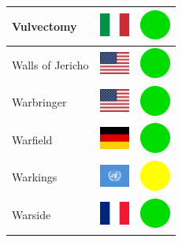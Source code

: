 \documentclass[12pt, a4paper, twoside]{report}
\begin{document}
\begin{center}
\begin{longtable}{|p{5cm}|p{2cm}|p{2cm}|}
 Vulvectomy                                                 & \includegraphics[width=1cm]{4x3/it} &   \includegraphics[width=1cm]{likes/y} \\ \hline
 Walls of Jericho                                           & \includegraphics[width=1cm]{4x3/us} &   \includegraphics[width=1cm]{likes/y} \\ \hline
 Warbringer                                                 & \includegraphics[width=1cm]{4x3/us} &   \includegraphics[width=1cm]{likes/y} \\ \hline
 Warfield                                                   & \includegraphics[width=1cm]{4x3/de} &   \includegraphics[width=1cm]{likes/y} \\ \hline
 Warkings                                                   & \includegraphics[width=1cm]{4x3/un} &   \includegraphics[width=1cm]{likes/m} \\ \hline
 Warside                                                    & \includegraphics[width=1cm]{4x3/fr} &   \includegraphics[width=1cm]{likes/y} \\ \hline

\end{longtable}
\end{center}
\end{document}
